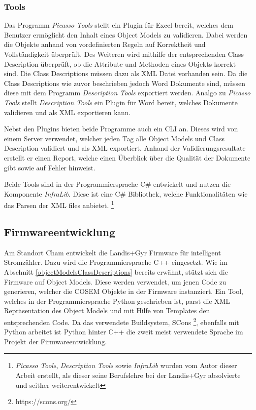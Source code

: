 \subsubsection{Tools}
Das Programm \textit{Picasso Tools} stellt ein Plugin für Excel bereit, welches dem Benutzer ermöglicht den Inhalt eines Object Models zu validieren.
Dabei werden die Objekte anhand von vordefinierten Regeln auf Korrektheit und Vollständigkeit überprüft.
Des Weiteren wird mithilfe der entsprechenden Class Description überprüft, ob die Attribute und Methoden eines Objekts korrekt sind.
Die Class Descriptions müssen dazu als XML Datei vorhanden sein.
Da die Class Descriptions wie zuvor beschrieben jedoch Word Dokumente sind, müssen diese mit dem Programm \textit{Description Tools} exportiert werden.
Analgo zu \textit{Picasso Tools} stellt \textit{Description Tools} ein Plugin für Word bereit, welches Dokumente validieren und als XML exportieren kann.

Nebst den Plugins bieten beide Programme auch ein \ac{CLI} an.
Dieses wird von einem Server verwendet, welcher jeden Tag alle Object Models und Class Description validiert und als XML exportiert.
Anhand der Validierungsresultate erstellt er einen Report, welche einen Überblick über die Qualität der Dokumente gibt sowie auf Fehler hinweist.

Beide Tools sind in der Programmiersprache C\# entwickelt und nutzen die Komponente \textit{InfraLib}.
Diese ist eine C\# Bibliothek, welche Funktionalitäten wie das Parsen der XML files anbietet. 
\footnote{\textit{Picasso Tools}, \textit{Description Tools} sowie \textit{InfraLib} wurden vom Autor dieser Arbeit erstellt, als dieser seine Berufslehre bei der Landis+Gyr absolvierte und seither weiterentwickelt }

\subsection{Firmwareentwicklung}\label{fwEntwicklung}
Am Standort Cham entwickelt die Landis+Gyr Firmware für intelligent Stromzähler.
Dazu wird die Programmiersprache C++ eingesetzt.
Wie im Abschnitt \ref{objectModelsClassDescriptions} bereits erwähnt, stützt sich die Firmware auf Object Models.
Diese werden verwendet, um jenen Code zu generieren, welcher die \ac{COSEM} Objekte in der Firmware instanziert.
Ein Tool, welches in der Programmiersprache Python geschrieben ist, parst die XML Repräsentation des Object Models und mit Hilfe von Templates den entsprechenden Code.
Da das verwendete Buildsystem, SCons \footnote{https://scons.org/}, ebenfalls mit Python arbeitet ist Python hinter C++ die zweit meist verwendete Sprache im Projekt der Firmwareentwicklung.

